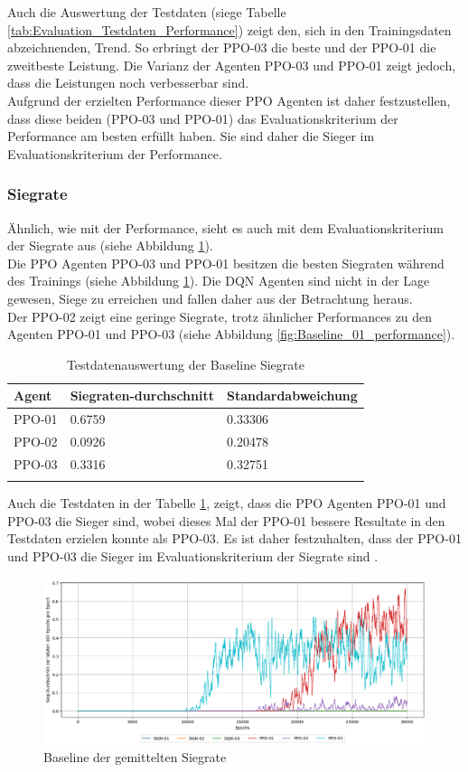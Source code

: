 Auch die Auswertung der Testdaten (siege Tabelle \ref{tab:Evaluation_Testdaten_Performance}) zeigt den, sich in den Trainingsdaten abzeichnenden, Trend. So erbringt der PPO-03 die beste und der PPO-01 die zweitbeste Leistung. Die Varianz der Agenten PPO-03 und PPO-01 zeigt jedoch, dass die Leistungen noch verbesserbar sind.\\
Aufgrund der erzielten Performance dieser PPO Agenten ist daher festzustellen, dass diese beiden (PPO-03 und PPO-01) das Evaluationskriterium der Performance am besten erfüllt haben. Sie sind daher die Sieger im Evaluationskriterium der Performance.

\subsubsection{Siegrate}
Ähnlich, wie mit der Performance, sieht es auch mit dem Evaluationskriterium der Siegrate aus (siehe Abbildung \ref{fig:Baseline_winrate}).\\
Die PPO Agenten PPO-03 und PPO-01 besitzen die besten Siegraten während des Trainings (siehe Abbildung \ref{fig:Baseline_winrate}). 
Die DQN Agenten sind nicht in der Lage gewesen, Siege zu erreichen und fallen daher aus der Betrachtung heraus.\\
Der PPO-02 zeigt eine geringe Siegrate, trotz ähnlicher Performances zu den Agenten PPO-01 und PPO-03 (siehe Abbildung \ref{fig:Baseline_01_performance}).
\begin{longtable}[h]{|p{3.7cm}|p{4.5cm}|p{4.5cm}|}
	\hline
	Agent & Siegraten-durchschnitt & Standardabweichung \\
	\hline
	PPO-01 & 0.6759 & 0.33306 \\
	\hline
	PPO-02 & 0.0926 & 0.20478 \\
	\hline
	PPO-03 & 0.3316 & 0.32751 \\
	\hline
	\caption{Testdatenauswertung der Baseline Siegrate}
	\label{tab:Evaluation_Testdaten_Winrate} 
\end{longtable}
Auch die Testdaten in der Tabelle \ref{tab:Evaluation_Testdaten_Winrate}, zeigt, dass die PPO Agenten PPO-01 und PPO-03 die Sieger sind, wobei dieses Mal der PPO-01 bessere Resultate in den Testdaten erzielen konnte als PPO-03. Es ist daher festzuhalten, dass der PPO-01 und PPO-03 die Sieger im Evaluationskriterium der Siegrate sind .
\begin{figure}[H]
	\centering
	\includegraphics[scale=0.4517]{Abbildungen/Evaluation/win-rate_baseline_01.png}
	\caption[Baseline Vergleich Siegrate]{Baseline der gemittelten Siegrate}
	\label{fig:Baseline_winrate}
\end{figure}

